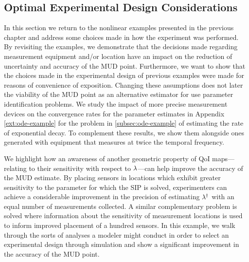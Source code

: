 \subsection{Optimal Experimental Design Considerations}

In this section we return to the nonlinear examples presented in the previous chapter and address some choices made in how the experiment was performed.
By revisiting the examples, we demonstrate that the decisions made regarding measurement equipment and/or location have an impact on the reduction of uncertainty and accuracy of the MUD point.
Furthermore, we want to show that the choices made in the experimental design of previous examples were made for reasons of convenience of exposition.
Changing these assumptions does not later the viability of the MUD point as an alternative estimator for use parameter identification problems.
We study the impact of more precise measurement devices on the convergence rates for the parameter estimates in Appendix \ref{ext:ode-example} for the problem in \ref{subsec:ode-example} of estimating the rate of exponential decay.
To complement these results, we show them alongside ones generated with equipment that measures at twice the temporal frequency.

We highlight how an awareness of another geometric property of QoI maps---relating to their sensitivity with respect to $\lambda$---can help improve the accuracy of the MUD estimate.
By placing sensors in locations which exhibit greater sensitivity to the parameter for which the SIP is solved, experimenters can achieve a considerable improvement in the precision of estimating $\lambda^\dagger$ with an equal number of measurements collected.
A similar complementary problem is solved where information about the sensitivity of measurement locations is used to inform improved placement of a hundred sensors.
In this example, we walk through the sorts of analyses a modeler might conduct in order to select an experimental design through simulation and show a significant improvement in the accuracy of the MUD point.


\FloatBarrier

